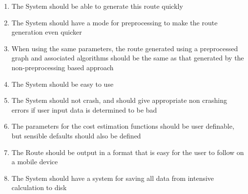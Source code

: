 \documentclass[11pt,twoside,a4paper]{report}
\begin{document}
\begin{enumerate}
\begin{enumerate}[label=\arabic{enumi}.\arabic*]
    \item \label{item-nine}The System should be able to generate this route quickly
    \item \label{item-ten}The System should have a mode for preprocessing to make the route generation even quicker
    \item \label{item-eleven}When using the same parameters, the route generated using a preprocessed graph and associated algorithms should be the same as that generated by the non-preprocessing based approach
    \item \label{item-twelve}The System should be easy to use
    \item \label{nocrashy} \label{item-thirteen}The System should not crash, and should give appropriate non crashing errors if user input data is determined to be bad
    \item \label{item-fourteen} The parameters for the cost estimation functions should be user definable, but sensible defaults should also be defined
    \item \label{item-fifteen}\label{followpossible}The Route should be output in a format that is easy for the user to follow on a mobile device
    \item \label{item-sixteen}The System should have a system for saving all data from intensive calculation to disk
\end{enumerate}
\end{enumerate}
\newpage
\end{document}
